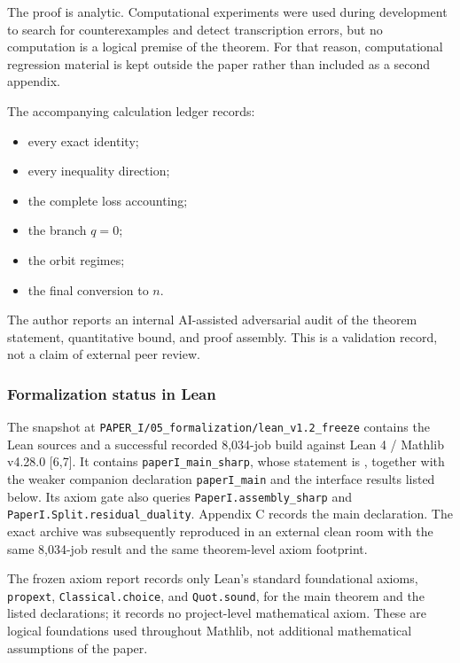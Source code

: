 \documentclass[english,11pt,a4paper]{article}
\providecommand{\tightlist}{\setlength{\itemsep}{0pt}\setlength{\parskip}{0pt}}
\begin{document}
The proof is analytic. Computational experiments were used during
development to search for counterexamples and detect transcription
errors, but no computation is a logical premise of the theorem. For that
reason, computational regression material is kept outside the paper
rather than included as a second appendix.

The accompanying calculation ledger records:

\begin{itemize}
\tightlist
\item
  every exact identity;
\item
  every inequality direction;
\item
  the complete loss accounting;
\item
  the branch \(q=0\);
\item
  the orbit regimes;
\item
  the final conversion to \(n\).
\end{itemize}

The author reports an internal AI-assisted adversarial audit of the
theorem statement, quantitative bound, and proof assembly. This is a
validation record, not a claim of external peer review.

\subsubsection{Formalization status in
Lean}\label{formalization-status-in-lean}

The snapshot at \nolinkurl{PAPER_I/05_formalization/lean_v1.2_freeze}
contains the Lean sources and a successful recorded 8,034-job build
against Lean 4 / Mathlib v4.28.0 {[}6,7{]}. It contains
\nolinkurl{paperI_main_sharp}, whose statement is
, together with the weaker companion
declaration \nolinkurl{paperI_main} and the interface results listed
below. Its axiom gate also queries \nolinkurl{PaperI.assembly_sharp} and
\nolinkurl{PaperI.Split.residual_duality}. Appendix C records the main
declaration. The exact archive was subsequently reproduced in an
external clean room with the same 8,034-job result and the same
theorem-level axiom footprint.

The frozen axiom report records only Lean's standard foundational
axioms, \nolinkurl{propext}, \nolinkurl{Classical.choice}, and
\nolinkurl{Quot.sound}, for the main theorem and the listed declarations;
it records no project-level mathematical axiom. These are logical
foundations used throughout Mathlib, not additional mathematical
assumptions of the paper.
\end{document}
